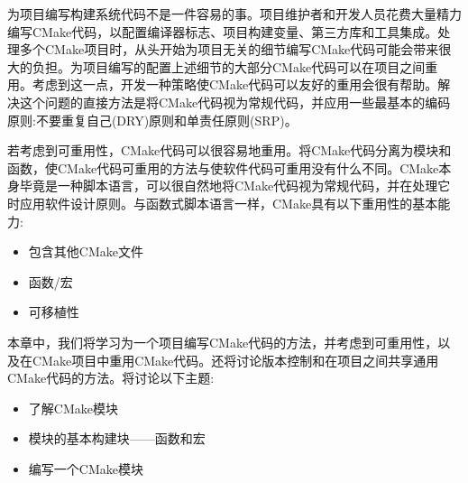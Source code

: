 
为项目编写构建系统代码不是一件容易的事。项目维护者和开发人员花费大量精力编写CMake代码，以配置编译器标志、项目构建变量、第三方库和工具集成。处理多个CMake项目时，从头开始为项目无关的细节编写CMake代码可能会带来很大的负担。为项目编写的配置上述细节的大部分CMake代码可以在项目之间重用。考虑到这一点，开发一种策略使CMake代码可以友好的重用会很有帮助。解决这个问题的直接方法是将CMake代码视为常规代码，并应用一些最基本的编码原则:不要重复自己(DRY)原则和单责任原则(SRP)。

若考虑到可重用性，CMake代码可以很容易地重用。将CMake代码分离为模块和函数，使CMake代码可重用的方法与使软件代码可重用没有什么不同。CMake本身毕竟是一种脚本语言，可以很自然地将CMake代码视为常规代码，并在处理它时应用软件设计原则。与函数式脚本语言一样，CMake具有以下重用性的基本能力:

\begin{itemize}
\item 
包含其他CMake文件

\item 
函数/宏

\item 
可移植性
\end{itemize}

本章中，我们将学习为一个项目编写CMake代码的方法，并考虑到可重用性，以及在CMake项目中重用CMake代码。还将讨论版本控制和在项目之间共享通用CMake代码的方法。将讨论以下主题:

\begin{itemize}
\item 
了解CMake模块

\item 
模块的基本构建块——函数和宏

\item 
编写一个CMake模块
\end{itemize}
